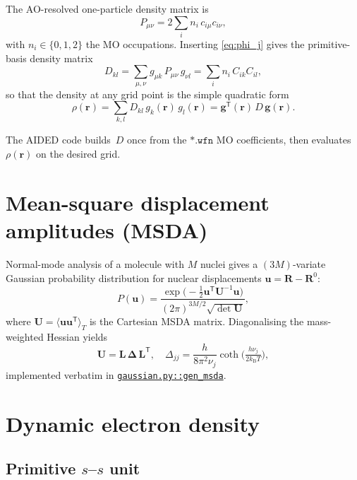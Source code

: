 \documentclass{article}
\newcommand*\matU{\bm U}             %
\begin{document}
The AO-resolved one-particle density matrix is
\[
  P_{\mu\nu}=2\sum_i n_i\,c_{i\mu}c_{i\nu},
\]
with $n_i\in\{0,1,2\}$ the MO occupations.  
Inserting \eqref{eq:phi_j} gives the primitive-basis density matrix
\begin{equation}\label{eq:Dkl}
  D_{kl}=\sum_{\mu,\nu} g_{\mu k}\,P_{\mu\nu}\,g_{\nu l}
        =\sum_{i} n_i\,C_{ik}C_{il},
\end{equation}
so that the density at any grid point is the simple quadratic form
\[
  \rho(\bm r)=\sum_{k,l} D_{kl}\,g_k(\bm r)\,g_l(\bm r)
            =\bm g^{\!\mathsf T}(\bm r)\,D\,\bm g(\bm r).
\]

The \textsc{AIDED} code builds~$D$ once from the $\mathtt{*.wfn}$ MO
coefficients, then evaluates $\rho(\bm r)$ on the desired grid.

\section{Mean-square displacement amplitudes (MSDA)}
\label{sec:msda}

Normal-mode analysis of a molecule with $M$ nuclei gives a $(3M)$-variate
Gaussian probability distribution for nuclear displacements
$\bm u=\bm R-\bm R^{0}$:
\begin{equation}\label{eq:Pu}
  P(\bm u)=\frac{\exp\!\bigl(-\tfrac12\bm u^{\mathsf T}\matU^{-1}\bm u\bigr)}
                {(2\pi)^{3M/2}\sqrt{\det\matU}},
\end{equation}
where $\matU=\langle\bm u\bm u^{\mathsf T}\rangle_T$ is the Cartesian MSDA
matrix.  Diagonalising the mass-weighted Hessian yields
\[
  \matU=\bm L\,\bm\Delta\,\bm L^{\mathsf T},
  \quad
  \Delta_{jj}=\frac{h}{8\pi^{2}\nu_j}
              \coth\!\bigl(\tfrac{h\nu_j}{2k_{\mathrm B}T}\bigr),
\]
implemented verbatim in
\href{https://github.com/drjrm3/aided/blob/main/aided/io/vib/gaussian.py}
{\texttt{gaussian.py::gen\_msda}}.

\section{Dynamic electron density}\label{sec:dynamic}

\subsection{Primitive $s$–$s$ unit}
\end{document}
